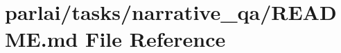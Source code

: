 \hypertarget{parlai_2tasks_2narrative__qa_2README_8md}{}\section{parlai/tasks/narrative\+\_\+qa/\+R\+E\+A\+D\+ME.md File Reference}
\label{parlai_2tasks_2narrative__qa_2README_8md}
